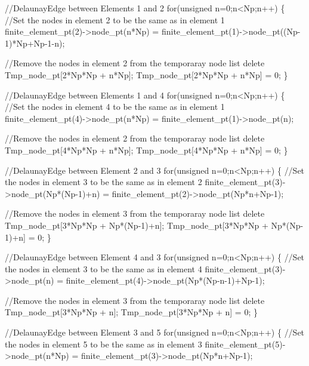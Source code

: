 \begin{DoxyCodeInclude}
   \textcolor{comment}{//DelaunayEdge between Elements 1 and 2}
   \textcolor{keywordflow}{for}(\textcolor{keywordtype}{unsigned} n=0;n<Np;n++)
    \{
     \textcolor{comment}{//Set the nodes in element 2 to be the same as in element 1}
     finite\_element\_pt(2)->node\_pt(n*Np)
      = finite\_element\_pt(1)->node\_pt((Np-1)*Np+Np-1-n);

     \textcolor{comment}{//Remove the nodes in element 2 from the temporaray node list}
     \textcolor{keyword}{delete} Tmp\_node\_pt[2*Np*Np + n*Np];
     Tmp\_node\_pt[2*Np*Np + n*Np] = 0;
    \}
   
   \textcolor{comment}{//DelaunayEdge between Elements 1 and 4}
   \textcolor{keywordflow}{for}(\textcolor{keywordtype}{unsigned} n=0;n<Np;n++)
    \{
     \textcolor{comment}{//Set the nodes in element 4 to be the same as in element 1}
     finite\_element\_pt(4)->node\_pt(n*Np)
      = finite\_element\_pt(1)->node\_pt(n);

     \textcolor{comment}{//Remove the nodes in element 2 from the temporaray node list}
     \textcolor{keyword}{delete} Tmp\_node\_pt[4*Np*Np + n*Np];
     Tmp\_node\_pt[4*Np*Np + n*Np] = 0;
    \}

   \textcolor{comment}{//DelaunayEdge between Element 2 and 3}
   \textcolor{keywordflow}{for}(\textcolor{keywordtype}{unsigned} n=0;n<Np;n++)
    \{
     \textcolor{comment}{//Set the nodes in element 3 to be the same as in element 2}
     finite\_element\_pt(3)->node\_pt(Np*(Np-1)+n)
      = finite\_element\_pt(2)->node\_pt(Np*n+Np-1);

     \textcolor{comment}{//Remove the nodes in element 3 from the temporaray node list}
     \textcolor{keyword}{delete} Tmp\_node\_pt[3*Np*Np + Np*(Np-1)+n];
     Tmp\_node\_pt[3*Np*Np + Np*(Np-1)+n] = 0;
    \}


   \textcolor{comment}{//DelaunayEdge between Element 4 and 3}
   \textcolor{keywordflow}{for}(\textcolor{keywordtype}{unsigned} n=0;n<Np;n++)
    \{
     \textcolor{comment}{//Set the nodes in element 3 to be the same as in element 4}
     finite\_element\_pt(3)->node\_pt(n)
      = finite\_element\_pt(4)->node\_pt(Np*(Np-n-1)+Np-1);

     \textcolor{comment}{//Remove the nodes in element 3 from the temporaray node list}
     \textcolor{keyword}{delete} Tmp\_node\_pt[3*Np*Np + n];
     Tmp\_node\_pt[3*Np*Np + n] = 0;
    \}


   \textcolor{comment}{//DelaunayEdge between Element 3 and 5}
   \textcolor{keywordflow}{for}(\textcolor{keywordtype}{unsigned} n=0;n<Np;n++)
    \{
     \textcolor{comment}{//Set the nodes in element 5 to be the same as in element 3}
     finite\_element\_pt(5)->node\_pt(n*Np)
      = finite\_element\_pt(3)->node\_pt(Np*n+Np-1);


\end{DoxyCodeInclude}
